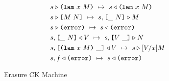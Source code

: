 \documentclass[../main.tex]{subfiles}
\begin{document}
\begin{figure*}[t]
    
    \begin{align*}
        &s \triangleright \texttt{(} \texttt{lam} ~ x ~ M \texttt{)} ~\mapsto~ s \triangleleft \texttt{(} \texttt{lam} ~ x ~ M \texttt{)}\\
        &s \triangleright \texttt{[} M ~ N \texttt{]} ~\mapsto~ s, \texttt{[} \_ ~ N \texttt{]} \triangleright M\\
        &s \triangleright \texttt{(} \texttt{error} \texttt{)}{} ~\mapsto~ s \triangleleft \texttt{(} \texttt{error} \texttt{)}{}\\
        &s, \texttt{[} \_ ~ N \texttt{]} \triangleleft V ~\mapsto~ s, \texttt{[} V ~ \_ \texttt{]} \triangleright N\\
        &s, \texttt{[} \texttt{(} \texttt{lam} ~ x ~ M \texttt{)} ~ \_ \texttt{]} \triangleleft V ~\mapsto~ s \triangleright [V/x]M\\
        &s, f \triangleleft \texttt{(} \texttt{error} \texttt{)}{} ~\mapsto~ s \triangleleft \texttt{(} \texttt{error} \texttt{)}{}\\
    \end{align*}
    
    \caption{Erasure CK Machine}
    \label{fig:Plutus_core_erasure_ck_machine}
\end{figure*}
\end{document}
